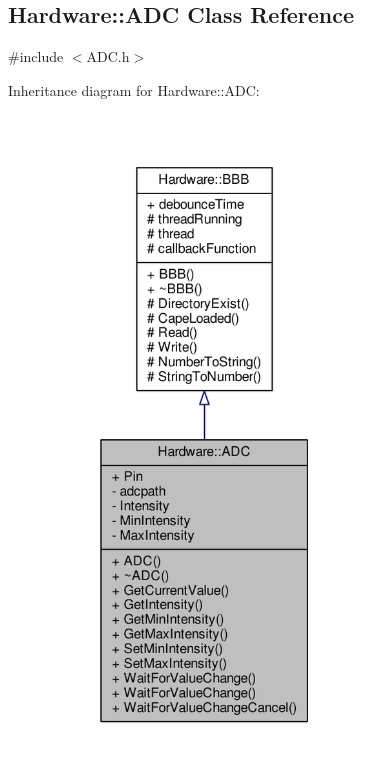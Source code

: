 \hypertarget{class_hardware_1_1_a_d_c}{}\subsection{Hardware\+:\+:A\+D\+C Class Reference}
\label{class_hardware_1_1_a_d_c}


{\ttfamily \#include $<$A\+D\+C.\+h$>$}



Inheritance diagram for Hardware\+:\+:A\+D\+C\+:
\nopagebreak
\begin{figure}[H]
\begin{center}
\leavevmode
\includegraphics[width=235pt]{class_hardware_1_1_a_d_c__inherit__graph}
\end{center}
\end{figure}


